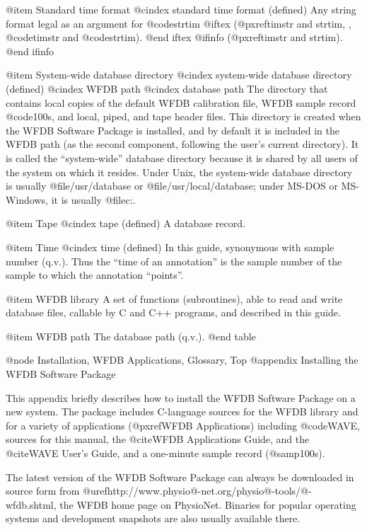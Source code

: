 {{{{{{{{{@item Standard time format
@cindex standard time format (defined)
Any string format legal as an argument for @code{strtim}
@iftex
(@pxref{timstr and strtim, , @code{timstr} and @code{strtim}}).
@end iftex
@ifinfo
(@pxref{timstr and strtim}).
@end ifinfo

@item System-wide database directory
@cindex system-wide database directory (defined)
@cindex WFDB path
@cindex database path
The directory that contains local copies of the default WFDB calibration file,
WFDB sample record @code{100s}, and local, piped, and tape header files.
This directory is created when the WFDB Software Package is installed, and
by default it is included in the WFDB path (as the second component, following
the user's current directory).  It is called the ``system-wide'' database
directory because it is shared by all users of the system on which it resides.
Under Unix, the system-wide database directory is usually @file{/usr/database}
or @file{/usr/local/database};  under MS-DOS or MS-Windows, it is usually
@file{c:\database}.

@item Tape
@cindex tape (defined)
A database record.

@item Time
@cindex time (defined)
In this guide, synonymous with sample number (q.v.).  Thus the ``time of
an annotation'' is the sample number of the sample to which the
annotation ``points''.

@item WFDB library
A set of functions (subroutines), able to read and write database files,
callable by C and C++ programs, and described in this guide.

@item WFDB path
The database path (q.v.).
@end table

@node     Installation, WFDB Applications, Glossary, Top
@appendix Installing the WFDB Software Package

This appendix briefly describes how to install the WFDB Software Package
on a new system.  The package includes C-language sources for the WFDB
library and for a variety of applications (@pxref{WFDB Applications}) including
@code{WAVE}, sources for this manual, the @cite{WFDB Applications Guide}, and
the @cite{WAVE User's Guide}, and a one-minute sample record (@samp{100s}).

The latest version of the WFDB Software Package can always be downloaded in
source form from @uref{http://www.physio@-net.org/physio@-tools/@-wfdb.shtml},
the WFDB home page on PhysioNet.  Binaries for popular operating systems and
development snapshots are also usually available there.

}}}}}}}}}
